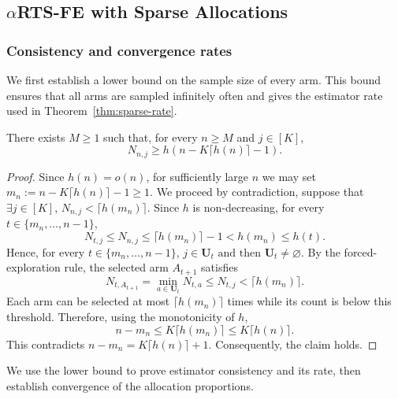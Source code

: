 		
		
		
\subsection{$\alpha$RTS-FE with Sparse Allocations}\label{proofs:sparse-case}
\subsubsection{Consistency and convergence rates}
{\color{revisiongreen}We first establish a lower bound on the sample size of every arm. This bound ensures that all arms are sampled infinitely often and gives the estimator rate used in Theorem~\ref{thm:sparse-rate}.
\begin{lemma}
		\label{lem:fe-lower-bound}
		There exists $M\ge1$ such that, for every $n\ge M$ and $j\in[K]$,
		\[
		N_{n,j}\ge h\!\left(n-K\lceil h(n)\rceil-1\right).
		\]
	\end{lemma}
	
	\begin{proof}
{\color{revisiongreen}
Since \(h(n)=o(n)\), for sufficiently large \(n\) we may set
\(
m_n:=n-K\lceil h(n)\rceil-1\geq1.
\)
We proceed by contradiction, suppose that \(\exists j\in[K]\),
\(N_{n,j}<\lceil h(m_n)\rceil\). Since \(h\) is non-decreasing, for every \(t\in\{m_n,\ldots,n-1\}\),
\[
N_{t,j}\leq N_{n,j}\leq\lceil h(m_n)\rceil-1
<h(m_n)\leq h(t).
\]
Hence, for every \(t\in\{m_n,\ldots,n-1\}\),
\(
j\in\mathbf U_t\text{ and then }\mathbf U_t\ne\varnothing.
\)
By the forced-exploration rule, the selected arm \(A_{t+1}\) satisfies
\[
N_{t,A_{t+1}}=\min_{a\in\mathbf U_t}N_{t,a}
\leq N_{t,j}<\lceil h(m_n)\rceil.
\]
Each arm can be selected at most \(\lceil h(m_n)\rceil\) times while its count is below this threshold. Therefore, using the monotonicity of \(h\),
\[
n-m_n\leq K\lceil h(m_n)\rceil\leq K\lceil h(n)\rceil.
\]
This contradicts \(n-m_n=K\lceil h(n)\rceil+1\). Consequently, the claim holds.}
\end{proof}
We use the lower bound to prove estimator consistency and its rate, then establish convergence of the allocation proportions.}

